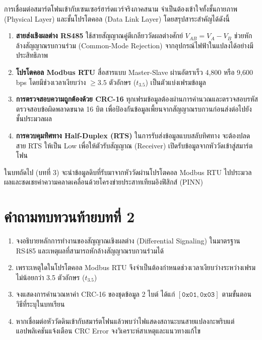 การเชื่อมต่อสมาร์ตโฟนเข้ากับเซนเซอร์ฮาร์ดแวร์จริงภาคสนาม จำเป็นต้องเข้าใจทั้งชั้นกายภาพ (Physical Layer) และชั้นโปรโตคอล (Data Link Layer) โดยสรุปสาระสำคัญได้ดังนี้
\begin{enumerate}
    \item \textbf{สายส่งเชิงผลต่าง RS485} ใช้สายสัญญาณคู่ตีเกลียววัดผลต่างศักย์ $V_{AB} = V_A - V_B$ ช่วยหักล้างสัญญาณรบกวนร่วม (Common-Mode Rejection) จากอุปกรณ์ไฟฟ้าในแปลงได้อย่างมีประสิทธิภาพ
    \item \textbf{โปรโตคอล Modbus RTU} สื่อสารแบบ Master-Slave ผ่านอัตราเร็ว 4,800 หรือ 9,600 bps โดยมีช่วงเวลาเงียบว่าง $\ge 3.5$ ตัวอักษร ($t_{3.5}$) เป็นตัวแบ่งเฟรมข้อมูล
    \item \textbf{การตรวจสอบความถูกต้องด้วย CRC-16} ทุกเฟรมข้อมูลต้องผ่านการคำนวณและตรวจสอบรหัสตรวจสอบข้อผิดพลาดขนาด 16 บิต เพื่อป้องกันข้อมูลเพี้ยนจากสัญญาณรบกวนก่อนส่งต่อไปยังชั้นประมวลผล
    \item \textbf{การควบคุมทิศทาง Half-Duplex (RTS)} ในการรับส่งข้อมูลแบบสลับทิศทาง จะต้องปลดสาย RTS ให้เป็น Low เพื่อให้ตัวรับสัญญาณ (Receiver) เปิดรับข้อมูลจากหัววัดเข้าสู่สมาร์ตโฟน
\end{enumerate}

ในบทถัดไป (บทที่ 3) จะนำข้อมูลดิบที่รับมาจากหัววัดผ่านโปรโตคอล Modbus RTU ไปประมวลผลและชดเชยค่าความคลาดเคลื่อนด้วยโครงข่ายประสาทเทียมอิงฟิสิกส์ (PINN)

\section*{คำถามทบทวนท้ายบทที่ 2}

\begin{enumerate}
    \item จงอธิบายหลักการทำงานของสัญญาณเชิงผลต่าง (Differential Signaling) ในมาตรฐาน RS485 และเหตุผลที่สามารถหักล้างสัญญาณรบกวนร่วมได้
    \item เพราะเหตุใดในโปรโตคอล Modbus RTU จึงจำเป็นต้องกำหนดช่วงเวลาเงียบว่างระหว่างเฟรมไม่น้อยกว่า 3.5 ตัวอักษร ($t_{3.5}$)
    \item จงแสดงการคำนวณหาค่า CRC-16 ของชุดข้อมูล 2 ไบต์ ได้แก่ $[\mathtt{0x01}, \mathtt{0x03}]$ ตามขั้นตอนวิธีที่ระบุในบทเรียน
    \item หากเชื่อมต่อหัววัดดินเข้ากับสมาร์ตโฟนแล้วพบว่าไฟแสดงสถานะบนสายแปลงกะพริบแต่แอปพลิเคชันแจ้งเตือน CRC Error จงวิเคราะห์สาเหตุและแนวทางแก้ไข
\end{enumerate}
